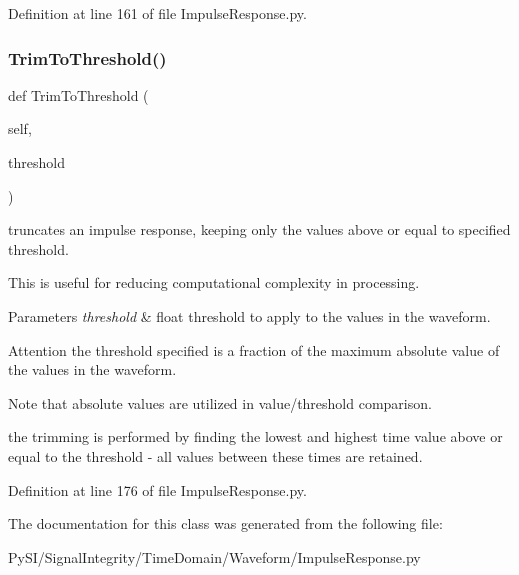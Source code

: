 Definition at line 161 of file Impulse\+Response.\+py.

\mbox{\label{classSignalIntegrity_1_1TimeDomain_1_1Waveform_1_1ImpulseResponse_1_1ImpulseResponse_ac9668c22e21b9fcbfb1163ba5c2f9577}} 
\subsubsection{\texorpdfstring{Trim\+To\+Threshold()}{TrimToThreshold()}}
{\footnotesize\ttfamily def Trim\+To\+Threshold (\begin{DoxyParamCaption}\item[{}]{self,  }\item[{}]{threshold }\end{DoxyParamCaption})}



truncates an impulse response, keeping only the values above or equal to specified threshold. 

This is useful for reducing computational complexity in processing.


\begin{DoxyParams}{Parameters}
{\em threshold} & float threshold to apply to the values in the waveform. \\
\hline
\end{DoxyParams}
\begin{DoxyAttention}{Attention}
the threshold specified is a fraction of the maximum absolute value of the values in the waveform. 
\end{DoxyAttention}
\begin{DoxyNote}{Note}
that absolute values are utilized in value/threshold comparison. 

the trimming is performed by finding the lowest and highest time value above or equal to the threshold -\/ all values between these times are retained. 
\end{DoxyNote}


Definition at line 176 of file Impulse\+Response.\+py.



The documentation for this class was generated from the following file\+:\begin{DoxyCompactItemize}
\item 
Py\+S\+I/\+Signal\+Integrity/\+Time\+Domain/\+Waveform/Impulse\+Response.\+py\end{DoxyCompactItemize}
